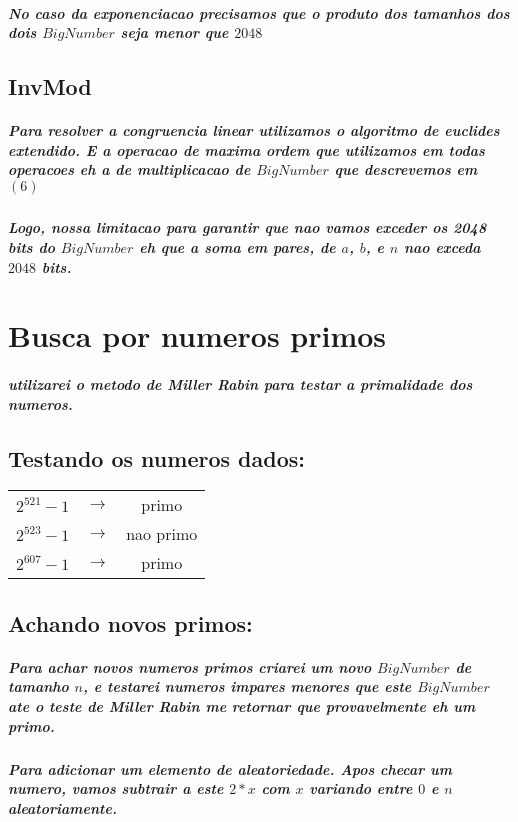 \documentclass[12pt,twoside, a4paper, twocolumn]{article}
\begin{document}
\subparagraph*{No caso da exponenciacao precisamos que o produto dos tamanhos dos dois $BigNumber$ seja menor que $2048$ }

\subsection{InvMod}

\subparagraph*{Para resolver a congruencia linear utilizamos o algoritmo de euclides extendido. E a operacao de maxima ordem que utilizamos em todas operacoes eh a de multiplicacao de $BigNumber$ que descrevemos em $(6)$}

\subparagraph*{Logo, nossa limitacao para garantir que nao vamos exceder os 2048 bits do $BigNumber$ eh que a soma em pares, de $a$, $b$, e $n$ nao exceda $2048$ bits.}



\section{Busca por numeros primos}

\subparagraph*{utilizarei o metodo de Miller Rabin para testar a primalidade dos numeros.}

\subsection{Testando os numeros dados:}

\begin{center}
    \begin{tabular}{ |ccc| }
        \hline
        $2^{521}-1$ & $\rightarrow$ & primo     \\
        $2^{523}-1$ & $\rightarrow$ & nao primo \\
        $2^{607}-1$ & $\rightarrow$ & primo     \\
        \hline
    \end{tabular}
\end{center}

\subsection{Achando novos primos:}

\subparagraph*{Para achar novos numeros primos criarei um novo $BigNumber$ de tamanho $n$, e testarei numeros impares menores que este $BigNumber$ ate o teste de Miller Rabin me retornar que provavelmente eh um primo.}

\subparagraph*{Para adicionar um elemento de aleatoriedade. Apos checar um numero, vamos subtrair a este $2*x$ com $x$ variando entre $0$ e $n$ aleatoriamente.}
\end{document}
